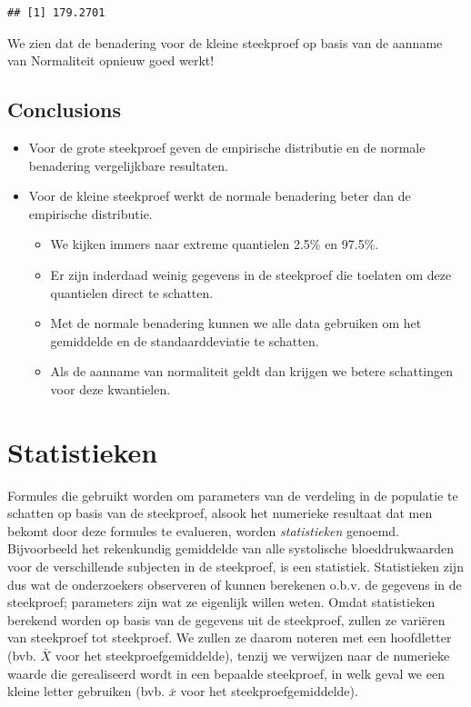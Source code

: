 \documentclass[
  12pt,dutch,coursenotes]{book}
\providecommand{\tightlist}{%
  \setlength{\itemsep}{0pt}\setlength{\parskip}{0pt}}
\theoremstyle{definition}
\theoremstyle{definition}
\theoremstyle{definition}
\theoremstyle{definition}
\theoremstyle{remark}
\begin{document}
\begin{lstlisting}
## [1] 179.2701
\end{lstlisting}

We zien dat de benadering voor de kleine steekproef op basis van de aanname van Normaliteit opnieuw goed werkt!

\hypertarget{conclusions}{%
\subsection{Conclusions}\label{conclusions}}

\begin{itemize}
\item
  Voor de grote steekproef geven de empirische distributie en de normale benadering vergelijkbare resultaten.
\item
  Voor de kleine steekproef werkt de normale benadering beter dan de empirische distributie.

  \begin{itemize}
  \tightlist
  \item
    We kijken immers naar extreme quantielen 2.5\% en 97.5\%.
  \item
    Er zijn inderdaad weinig gegevens in de steekproef die toelaten om deze quantielen direct te schatten.
  \item
    Met de normale benadering kunnen we alle data gebruiken om het gemiddelde en de standaarddeviatie te schatten.
  \item
    Als de aanname van normaliteit geldt dan krijgen we betere schattingen voor deze kwantielen.
  \end{itemize}
\end{itemize}

\hypertarget{statistieken}{%
\section{Statistieken}\label{statistieken}}

Formules die gebruikt worden om parameters van de verdeling in de populatie te schatten op basis van de
steekproef, alsook het numerieke resultaat dat men bekomt door deze formules
te evalueren, worden \emph{statistieken} genoemd.
Bijvoorbeeld het
rekenkundig gemiddelde van alle systolische bloeddrukwaarden voor de verschillende subjecten
in de steekproef, is een statistiek. Statistieken zijn dus wat
de onderzoekers observeren of kunnen berekenen o.b.v. de gegevens in de
steekproef; parameters zijn wat ze eigenlijk willen weten.
Omdat statistieken berekend worden op basis van de gegevens uit de steekproef, zullen ze variëren van steekproef tot steekproef.
We zullen ze daarom noteren met een hoofdletter (bvb. \(\bar X\) voor het steekproefgemiddelde), tenzij we verwijzen naar de numerieke waarde die gerealiseerd wordt in een bepaalde steekproef, in welk geval we een kleine letter gebruiken (bvb. \(\bar x\) voor het steekproefgemiddelde).
\end{document}
